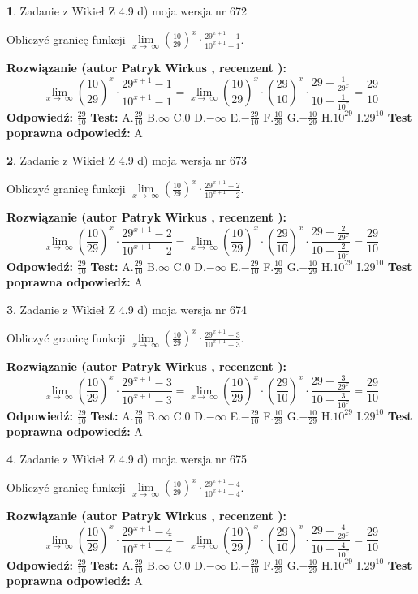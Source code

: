 \documentclass[12pt, a4paper]{article}
\theoremstyle{definition} %
\newtheorem{zad}{}
\newcommand{\zadStart}[1]{\begin{zad}#1\newline}
\newcommand{\zadStop}{\end{zad}}
\newcommand{\rozwStart}[2]{\noindent \textbf{Rozwiązanie (autor #1 , recenzent #2): }\newline}
\newcommand{\rozwStop}{\newline}
\newcommand{\odpStart}{\noindent \textbf{Odpowiedź:}\newline}
\newcommand{\odpStop}{\newline}
\newcommand{\testStart}{\noindent \textbf{Test:}\newline}
\newcommand{\testStop}{\newline}
\newcommand{\kluczStart}{\noindent \textbf{Test poprawna odpowiedź:}\newline}
\newcommand{\kluczStop}{\newline}
\begin{document}
\zadStart{Zadanie z Wikieł Z 4.9 d) moja wersja nr 672}


Obliczyć granicę funkcji  $\lim\limits_{x\to\ \infty}(\frac{10}{29})^{x}\cdot\frac{29^{x+1}-1}{10^{x+1}-1}$.
\zadStop
\rozwStart{Patryk Wirkus}{}
$$\lim\limits_{x\to\ \infty}(\frac{10}{29})^{x}\cdot\frac{29^{x+1}-1}{10^{x+1}-1}=\lim\limits_{x\to\ \infty}(\frac{10}{29})^{x}\cdot(\frac{29}{10})^{x} \cdot \frac{29-\frac{1}{29^{x}}}{10-\frac{1}{10^{x}}} = \frac{29}{10}$$
\rozwStop
\odpStart
$\frac{29}{10}$
\odpStop
\testStart
A.$\frac{29}{10}$ B.$\infty$ C.$0$ D.$-\infty$ E.$-\frac{29}{10}$
F.$\frac{10}{29}$ G.$-\frac{10}{29}$
H.$10^{29}$
I.$29^{10}$
\testStop
\kluczStart
A
\kluczStop



\zadStart{Zadanie z Wikieł Z 4.9 d) moja wersja nr 673}


Obliczyć granicę funkcji  $\lim\limits_{x\to\ \infty}(\frac{10}{29})^{x}\cdot\frac{29^{x+1}-2}{10^{x+1}-2}$.
\zadStop
\rozwStart{Patryk Wirkus}{}
$$\lim\limits_{x\to\ \infty}(\frac{10}{29})^{x}\cdot\frac{29^{x+1}-2}{10^{x+1}-2}=\lim\limits_{x\to\ \infty}(\frac{10}{29})^{x}\cdot(\frac{29}{10})^{x} \cdot \frac{29-\frac{2}{29^{x}}}{10-\frac{2}{10^{x}}} = \frac{29}{10}$$
\rozwStop
\odpStart
$\frac{29}{10}$
\odpStop
\testStart
A.$\frac{29}{10}$ B.$\infty$ C.$0$ D.$-\infty$ E.$-\frac{29}{10}$
F.$\frac{10}{29}$ G.$-\frac{10}{29}$
H.$10^{29}$
I.$29^{10}$
\testStop
\kluczStart
A
\kluczStop



\zadStart{Zadanie z Wikieł Z 4.9 d) moja wersja nr 674}


Obliczyć granicę funkcji  $\lim\limits_{x\to\ \infty}(\frac{10}{29})^{x}\cdot\frac{29^{x+1}-3}{10^{x+1}-3}$.
\zadStop
\rozwStart{Patryk Wirkus}{}
$$\lim\limits_{x\to\ \infty}(\frac{10}{29})^{x}\cdot\frac{29^{x+1}-3}{10^{x+1}-3}=\lim\limits_{x\to\ \infty}(\frac{10}{29})^{x}\cdot(\frac{29}{10})^{x} \cdot \frac{29-\frac{3}{29^{x}}}{10-\frac{3}{10^{x}}} = \frac{29}{10}$$
\rozwStop
\odpStart
$\frac{29}{10}$
\odpStop
\testStart
A.$\frac{29}{10}$ B.$\infty$ C.$0$ D.$-\infty$ E.$-\frac{29}{10}$
F.$\frac{10}{29}$ G.$-\frac{10}{29}$
H.$10^{29}$
I.$29^{10}$
\testStop
\kluczStart
A
\kluczStop



\zadStart{Zadanie z Wikieł Z 4.9 d) moja wersja nr 675}


Obliczyć granicę funkcji  $\lim\limits_{x\to\ \infty}(\frac{10}{29})^{x}\cdot\frac{29^{x+1}-4}{10^{x+1}-4}$.
\zadStop
\rozwStart{Patryk Wirkus}{}
$$\lim\limits_{x\to\ \infty}(\frac{10}{29})^{x}\cdot\frac{29^{x+1}-4}{10^{x+1}-4}=\lim\limits_{x\to\ \infty}(\frac{10}{29})^{x}\cdot(\frac{29}{10})^{x} \cdot \frac{29-\frac{4}{29^{x}}}{10-\frac{4}{10^{x}}} = \frac{29}{10}$$
\rozwStop
\odpStart
$\frac{29}{10}$
\odpStop
\testStart
A.$\frac{29}{10}$ B.$\infty$ C.$0$ D.$-\infty$ E.$-\frac{29}{10}$
F.$\frac{10}{29}$ G.$-\frac{10}{29}$
H.$10^{29}$
I.$29^{10}$
\testStop
\kluczStart
A
\kluczStop
\end{document}
